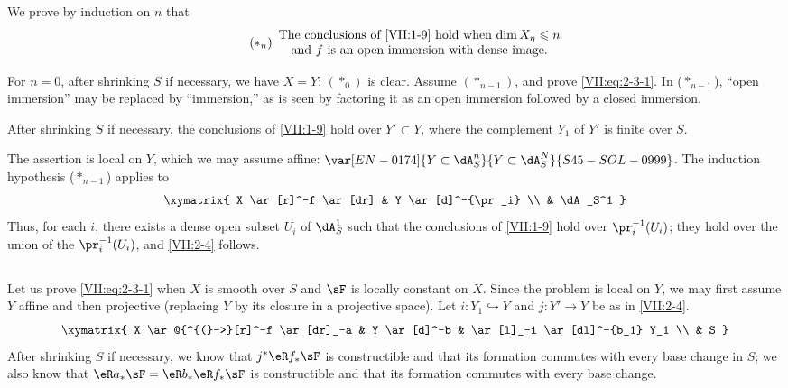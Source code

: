 We prove by induction on $n$ that
\begin{equation*}\tag{$\ast_n$}\label{VII:eq:2-3-1}
  \begin{array}{c}
    \text{The conclusions of \ref{VII:1-9} hold when $\dim{X_\eta}\leqslant n$} \\
    \text{and $f$ is an open immersion with dense image.}
  \end{array}
\end{equation*}

For $n=0$, after shrinking $S$ if necessary, we have $X=Y$: $(\ast_0)$ is
clear. Assume $(\ast_{n-1})$, and prove \eqref{VII:eq:2-3-1}. In
($\ast_{n-1}$), ``open immersion'' may be replaced by ``immersion,'' as is
seen by factoring it as an open immersion followed by a closed immersion.





\begin{lemma_}\label{VII:2-4}
After shrinking $S$ if necessary, the conclusions of \ref{VII:1-9} hold over
$Y'\subset Y$, where the complement $Y_1$ of $Y'$ is finite over $S$.
\end{lemma_}

The assertion is local on $Y$, which we may assume affine:
$\var[EN-0174]{Y\subset \dA_S^n}{Y\subset \dA_S^N}{S45-SOL-0999}$. The induction hypothesis ($\ast_{n-1}$) applies to
\[\xymatrix{
  X \ar[r]^-f \ar[dr] 
    & Y \ar[d]^-{\pr_i} \\
  & \dA_S^1 
}\]
Thus, for each $i$, there exists a dense open subset $U_i$ of $\dA_S^1$ such
that the conclusions of \ref{VII:1-9} hold over $\pr_i^{-1}(U_i)$; they hold
over the union of the $\pr_i^{-1}(U_i)$, and \ref{VII:2-4} follows.





\addtocounter{subsection}{1} %
\subsection{}\label{VII:2-6}

Let us prove \eqref{VII:eq:2-3-1} when $X$ is smooth over $S$ and $\sF$ is
locally constant on $X$. Since the problem is local on $Y$, we may first
assume $Y$ affine and then projective (replacing $Y$ by its closure in a
projective space). Let $i:Y_1\hookrightarrow Y$ and $j:Y' \to Y$ be as in
\ref{VII:2-4}.
\[\xymatrix{
  X \ar@{^{(}->}[r]^-f \ar[dr]_-a 
    & Y \ar[d]^-b 
    & \ar[l]_-i \ar[dl]^-{b_1} Y_1 \\
  & S 
}\] 
After shrinking $S$ if necessary, we know that $j^\ast \eR f_\ast \sF$ is
constructible and that its formation commutes with every base change in $S$;
we also know that $\eR a_\ast \sF = \eR b_\ast \eR f_\ast \sF$ is
constructible and that its formation commutes with every base change.

